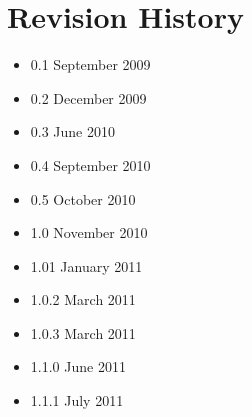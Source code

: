 \documentclass[11pt]{article}
\begin{document}
\section*{Revision History}
\begin{itemize}
\item 0.1 September 2009
\item 0.2 December 2009
\item 0.3 June 2010
\item 0.4 September 2010
\item 0.5 October 2010
\item 1.0 November 2010
\item 1.01 January 2011
\item 1.0.2 March 2011
\item 1.0.3 March 2011
\item 1.1.0 June 2011
\item 1.1.1 July 2011
\end{itemize}



\end{document}

